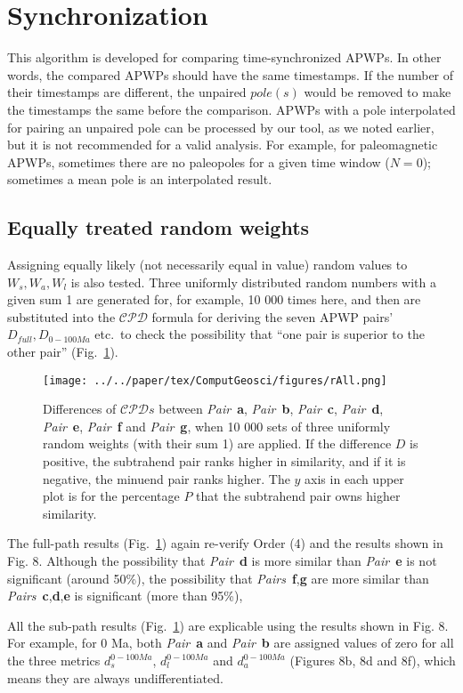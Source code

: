 \section{Synchronization}
This algorithm is developed for comparing time-synchronized APWPs. In other
words, the compared APWPs should have the same timestamps. If the number of
their timestamps are different, the unpaired $pole(s)$ would be removed to make
the timestamps the same before the comparison. APWPs with a pole interpolated
for pairing an unpaired pole can be processed by our tool, as we noted earlier,
but it is not recommended for a valid analysis. For example, for paleomagnetic
APWPs, sometimes there are no paleopoles for a given time window ($N=0$);
sometimes a mean pole is an interpolated result.

\subsection{Equally treated random weights}
Assigning equally likely (not necessarily equal in value) random values to
$W_s,W_a,W_l$ is also tested. Three uniformly distributed random numbers with a
given sum 1 are generated for, for example, 10 000 times here, and then are
substituted into the $\mathcal{CPD}$ formula for deriving the seven APWP
pairs' $D_{full},D_{0-100Ma}$ etc.\ to check the possibility that ``one pair is
superior to the other pair'' (Fig.~\ref{fig:rall}).

\begin{figure}[tbp]
\centering
\texttt{[image: ../../paper/tex/ComputGeosci/figures/rAll.png]}
\caption[Comparisons of Pairs a-g with random weights involved]{Differences of
$\mathcal{CPD}s$ between \emph{Pair}~\textbf{a}, \emph{Pair}~\textbf{b},
\emph{Pair}~\textbf{c}, \emph{Pair}~\textbf{d}, \emph{Pair}~\textbf{e},
\emph{Pair}~\textbf{f} and \emph{Pair}~\textbf{g}, when 10 000 sets of three
uniformly random weights (with
their sum 1) are applied. If the difference $D$ is positive, the subtrahend pair
ranks higher in similarity, and if it is negative, the minuend pair ranks
higher. The $y$ axis in each upper plot is for the percentage $P$ that the
subtrahend pair owns higher similarity.}\label{fig:rall}
\end{figure}

The full-path results (Fig.~\ref{fig:rall}) again re-verify Order (4) and
the results shown in Fig. 8. Although the possibility that
\emph{Pair}~\textbf{d} is more similar than \emph{Pair}~\textbf{e} is not
significant (around 50\%), the possibility that
\emph{Pairs}~\textbf{f},\textbf{g} are more similar than
\emph{Pairs}~\textbf{c},\textbf{d},\textbf{e} is significant (more than 95\%),

All the sub-path results (Fig.~\ref{fig:rall}) are explicable using the results
shown in Fig. 8. For example, for 0 Ma, both
\emph{Pair}~\textbf{a} and \emph{Pair}~\textbf{b} are assigned values of zero
for all the three metrics $d_s^{0-100Ma}$, $d_l^{0-100Ma}$ and $d_a^{0-100Ma}$
(Figures 8b, 8d and 8f), which means they are always undifferentiated.
